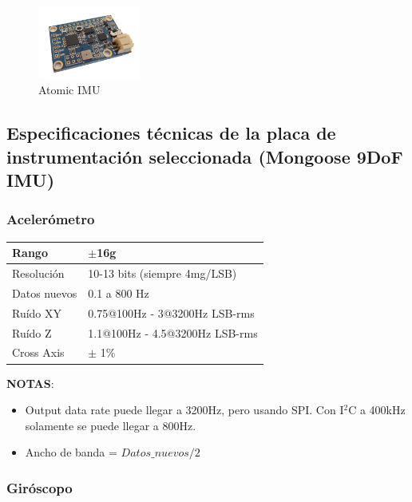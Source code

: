 \documentclass[main]{subfiles}
\begin{document}
\begin{figure}[H]
	\centering
	\includegraphics[width=0.3\textwidth]{./pics_eleccion_hardware/Mongoose.png}
	\caption{Atomic IMU}
	\label{fig:Mongoose}
\end{figure}

\newpage
\subsection{Especificaciones t\'ecnicas de la placa de instrumentaci\'on seleccionada (Mongoose 9DoF IMU)}
\vspace*{15pt}

\subsubsection{Aceler\'ometro}

\begin{table}[H]
\begin{center}
\begin{tabular}{|p{3cm}|p{6.5cm}|}
\hline
Rango & $\pm$16g \\
\hline
Resoluci\'on & 10-13 bits (siempre 4mg/LSB) \\
\hline
Datos nuevos &  0.1 a 800 Hz\\
\hline
Ru\'ido XY & 0.75@100Hz - 3@3200Hz LSB-rms\\
\hline
Ru\'ido Z & 1.1@100Hz - 4.5@3200Hz LSB-rms\\
\hline
Cross Axis & $\pm$ 1\% \\
\hline
\end{tabular}
\label{tab:acc-elec-hw}
\end{center}
\end{table}

\textbf{NOTAS}:
\begin{itemize}
\item Output data rate puede llegar a 3200Hz, pero usando SPI. Con I$^2$C a 400kHz solamente se puede llegar a 800Hz.
\item Ancho de banda = $Datos\_nuevos/2$
\end{itemize}

\subsubsection{Gir\'oscopo}
\end{document}
